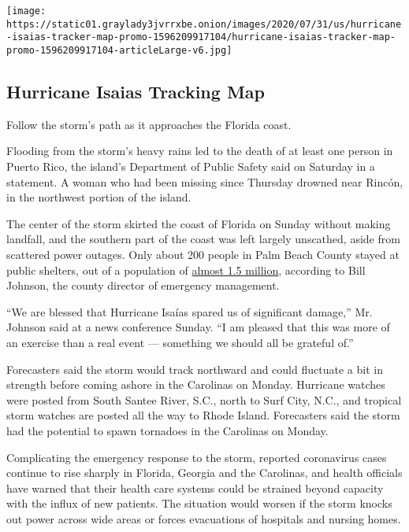 \href{https://www.nytimes3xbfgragh.onion/interactive/2020/07/31/us/hurricane-isaias-tracker-map.html}{}

\texttt{[image: https://static01.graylady3jvrrxbe.onion/images/2020/07/31/us/hurricane-isaias-tracker-map-promo-1596209917104/hurricane-isaias-tracker-map-promo-1596209917104-articleLarge-v6.jpg]}

\hypertarget{hurricane-isaias-tracking-map}{%
\subsection{Hurricane Isaias Tracking
Map}\label{hurricane-isaias-tracking-map}}

Follow the storm's path as it approaches the Florida coast.

Flooding from the storm's heavy rains led to the death of at least one
person in Puerto Rico, the island's Department of Public Safety said on
Saturday in a statement. A woman who had been missing since Thursday
drowned near Rincón, in the northwest portion of the island.

The center of the storm skirted the coast of Florida on Sunday without
making landfall, and the southern part of the coast was left largely
unscathed, aside from scattered power outages. Only about 200 people in
Palm Beach County stayed at public shelters, out of a population of
\href{https://slack-redir.net/link?url=https\%3A\%2F\%2Fdiscover.pbcgov.org\%2Fpages\%2Fpbc_facts.aspx}{almost
1.5 million}, according to Bill Johnson, the county director of
emergency management.

``We are blessed that Hurricane Isaías spared us of significant
damage,'' Mr. Johnson said at a news conference Sunday. ``I am pleased
that this was more of an exercise than a real event --- something we
should all be grateful of.''

Forecasters said the storm would track northward and could fluctuate a
bit in strength before coming ashore in the Carolinas on Monday.
Hurricane watches were posted from South Santee River, S.C., north to
Surf City, N.C., and tropical storm watches are posted all the way to
Rhode Island. Forecasters said the storm had the potential to spawn
tornadoes in the Carolinas on Monday.

Complicating the emergency response to the storm, reported coronavirus
cases continue to rise sharply in Florida, Georgia and the Carolinas,
and health officials have warned that their health care systems could be
strained beyond capacity with the influx of new patients. The situation
would worsen if the storm knocks out power across wide areas or forces
evacuations of hospitals and nursing homes.

